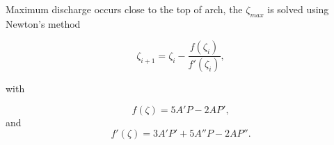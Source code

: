 






\noindent Maximum discharge occurs close to the top of arch, the $\zeta_{max}$ is solved using Newton's method

\begin{equation}  
\zeta _{i+1} = \zeta _i - \frac{f(\zeta _i)}{f'(\zeta_i)},
\end{equation}

\noindent with %

\begin{equation}  
f(\zeta) = 5A'P -  2AP',
\end{equation}
and
\begin{equation}  
f'(\zeta) = 3A'P' + 5A''P - 2AP''.
\end{equation}


